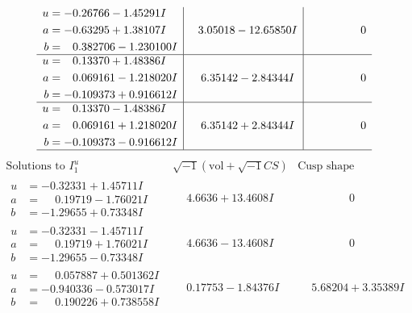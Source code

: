 \documentclass[1p]{elsarticle_modified}
\theoremstyle{definition}
\newcommand{\I}{\sqrt{-1}}
\begin{document}
$$\begin{array}{c|c|c}
\begin{aligned}
u &= -0.26766 - 1.45291 I \\
a &= -0.63295 + 1.38107 I \\
b &= \phantom{-}0.382706 - 1.230100 I\end{aligned}
 & \phantom{-}3.05018 - 12.65850 I & \phantom{-0.000000 } 0 \\ \hline\begin{aligned}
u &= \phantom{-}0.13370 + 1.48386 I \\
a &= \phantom{-}0.069161 - 1.218020 I \\
b &= -0.109373 + 0.916612 I\end{aligned}
 & \phantom{-}6.35142 - 2.84344 I & \phantom{-0.000000 } 0 \\ \hline\begin{aligned}
u &= \phantom{-}0.13370 - 1.48386 I \\
a &= \phantom{-}0.069161 + 1.218020 I \\
b &= -0.109373 - 0.916612 I\end{aligned}
 & \phantom{-}6.35142 + 2.84344 I & \phantom{-0.000000 } 0\\
 \hline 
 \end{array}$$\newpage$$\begin{array}{c|c|c}  
\text{Solutions to }I^u_{1}& \I (\text{vol} + \sqrt{-1}CS) & \text{Cusp shape}\\
 \hline 
\begin{aligned}
u &= -0.32331 + 1.45711 I \\
a &= \phantom{-}0.19719 - 1.76021 I \\
b &= -1.29655 + 0.73348 I\end{aligned}
 & \phantom{-}4.6636 + 13.4608 I & \phantom{-0.000000 } 0 \\ \hline\begin{aligned}
u &= -0.32331 - 1.45711 I \\
a &= \phantom{-}0.19719 + 1.76021 I \\
b &= -1.29655 - 0.73348 I\end{aligned}
 & \phantom{-}4.6636 - 13.4608 I & \phantom{-0.000000 } 0 \\ \hline\begin{aligned}
u &= \phantom{-}0.057887 + 0.501362 I \\
a &= -0.940336 - 0.573017 I \\
b &= \phantom{-}0.190226 + 0.738558 I\end{aligned}
 & \phantom{-}0.17753 - 1.84376 I & \phantom{-}5.68204 + 3.35389 I \\ \hline\begin{aligned}

\end{aligned}
\end{array}$$
\end{document}
